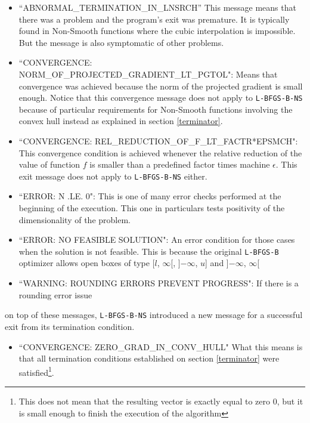 \begin{itemize}

\item ``ABNORMAL\_TERMINATION\_IN\_LNSRCH'' This message means that there was a problem and the program's exit was premature. It is typically found in Non-Smooth functions where the cubic interpolation is impossible. But the message is also symptomatic of other problems.

\item ``CONVERGENCE: NORM\_OF\_PROJECTED\_GRADIENT\_LT\_PGTOL": Means that convergence was achieved because the norm of the projected gradient is small enough. Notice that this convergence message does not apply to \texttt{L-BFGS-B-NS} because of particular requirements for Non-Smooth functions involving the convex hull instead as explained in section \eqref{terminator}.
\item ``CONVERGENCE: REL\_REDUCTION\_OF\_F\_LT\_FACTR*EPSMCH": This convergence condition is achieved whenever the relative reduction of the value of function $f$ is smaller than a predefined factor times machine $\epsilon$. This exit message does not apply to \texttt{L-BFGS-B-NS} either.

\item ``ERROR: N .LE. 0": This is one of many error checks performed at the beginning of the execution. This one in particulars tests positivity of the dimensionality of the problem.

\item ``ERROR: NO FEASIBLE SOLUTION": An error condition for those cases when the solution is not feasible. This is because the original \texttt{L-BFGS-B} optimizer allows open boxes of type [$l$, $\infty$[, ]$-\infty$, $u$] and ]$-\infty$, $\infty$[

\item ``WARNING: ROUNDING ERRORS PREVENT PROGRESS": If there is a rounding error issue

\end{itemize}

on top of these messages, \texttt{L-BFGS-B-NS} introduced a new message for a successful exit from its termination condition.

\begin{itemize}
\item ``CONVERGENCE: ZERO\_GRAD\_IN\_CONV\_HULL" What this means is that all termination conditions established on section \eqref{terminator} were satisfied\footnote{This does not mean that the resulting vector is exactly equal to zero $0$, but it is small enough to finish the execution of the algorithm}.
\end{itemize}

